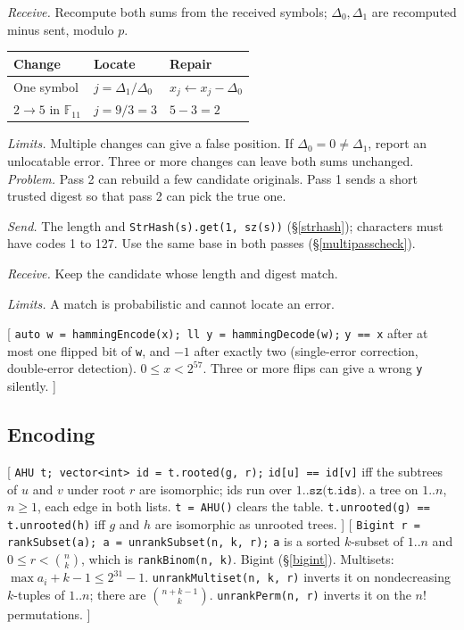 {\textit{Receive.} Recompute both sums from the received symbols; $\Delta_0,\Delta_1$ are recomputed minus sent, modulo $p$.
\par\begin{tabular}{@{}lll@{}}
\toprule
Change & Locate & Repair \\
\midrule
One symbol & $j=\Delta_1/\Delta_0$ & $x_j\gets x_j-\Delta_0$ \\
$2\to5$ in $\mathbb F_{11}$ & $j=9/3=3$ & $5-3=2$ \\
\bottomrule
\end{tabular}\par
\textit{Limits.} Multiple changes can give a false position. If $\Delta_0=0\ne\Delta_1$, report an unlocatable error. Three or more changes can leave both sums unchanged.
\textit{Problem.} Pass 2 can rebuild a few candidate originals. Pass 1 sends a short trusted digest so that pass 2 can pick the true one.
\par\textit{Send.} The length and \texttt{StrHash(s).get(1, sz(s))} (\S\ref{strhash}); characters must have codes 1 to 127. Use the same base in both passes (\S\ref{multipasscheck}).
\par\textit{Receive.} Keep the candidate whose length and digest match.
\par\textit{Limits.} A match is probabilistic and cannot locate an error.
}
[
	 \texttt{auto w = hammingEncode(x); ll y = hammingDecode(w);}
	 \texttt{y == x} after at most one flipped bit of \texttt{w}, and $-1$ after exactly two (single-error correction, double-error detection).
	 $0 \le x < 2^{57}$. Three or more flips can give a wrong \texttt{y} silently.
]\label{hamming}

\subsection{Encoding}
[
	 \texttt{AHU t; vector<int> id = t.rooted(g, r);}
	 \texttt{id[u] == id[v]} iff the subtrees of $u$ and $v$ under root $r$ are isomorphic; ids run over $1..\texttt{sz(t.ids)}$.
	 a tree on $1..n$, $n \ge 1$, each edge in both lists. \texttt{t = AHU()} clears the table.
	 \texttt{t.unrooted(g) == t.unrooted(h)} iff $g$ and $h$ are isomorphic as unrooted trees.
]\label{ahu}
[
	 \texttt{Bigint r = rankSubset(a); a = unrankSubset(n, k, r);}
	 \texttt{a} is a sorted $k$-subset of $1..n$ and $0 \le r < \binom{n}{k}$, which is \texttt{rankBinom(n, k)}.
	 Bigint (\S\ref{bigint}). Multisets: $\max a_i + k - 1 \le 2^{31}-1$.
	 \texttt{unrankMultiset(n, k, r)} inverts it on nondecreasing $k$-tuples of $1..n$; there are $\binom{n+k-1}{k}$.
	 \texttt{unrankPerm(n, r)} inverts it on the $n!$ permutations.
]\label{rankunrank}
